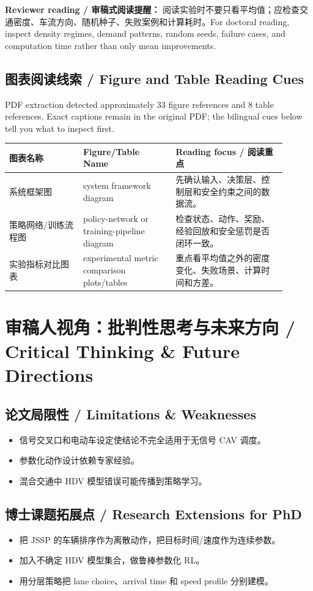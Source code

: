 \documentclass[UTF8,a4paper,11pt,fontset=fandol]{ctexart}
\begin{document}
\textbf{Reviewer reading / 审稿式阅读提醒：} 阅读实验时不要只看平均值；应检查交通密度、车流方向、随机种子、失败案例和计算耗时。For doctoral reading, inspect density regimes, demand patterns, random seeds, failure cases, and computation time rather than only mean improvements.

\subsection{图表阅读线索 / Figure and Table Reading Cues}
PDF extraction detected approximately 33 figure references and 8 table references. Exact captions remain in the original PDF; the bilingual cues below tell you what to inspect first.

\begin{longtable}{p{0.24\linewidth}p{0.30\linewidth}p{0.36\linewidth}}
\toprule
图表名称 & Figure/Table Name & Reading focus / 阅读重点\\
\midrule
系统框架图 & system framework diagram & 先确认输入、决策层、控制层和安全约束之间的数据流。 \\
策略网络/训练流程图 & policy-network or training-pipeline diagram & 检查状态、动作、奖励、经验回放和安全惩罚是否闭环一致。 \\
实验指标对比图表 & experimental metric comparison plots/tables & 重点看平均值之外的密度变化、失败场景、计算时间和方差。 \\
\bottomrule
\end{longtable}

\section{审稿人视角：批判性思考与未来方向 / Critical Thinking \& Future Directions}
\subsection{论文局限性 / Limitations \& Weaknesses}
\begin{itemize}
\item 信号交叉口和电动车设定使结论不完全适用于无信号 CAV 调度。
\item 参数化动作设计依赖专家经验。
\item 混合交通中 HDV 模型错误可能传播到策略学习。
\end{itemize}


\subsection{博士课题拓展点 / Research Extensions for PhD}
\begin{itemize}
\item 把 JSSP 的车辆排序作为离散动作，把目标时间/速度作为连续参数。
\item 加入不确定 HDV 模型集合，做鲁棒参数化 RL。
\item 用分层策略把 lane choice、arrival time 和 speed profile 分别建模。
\end{itemize}
\end{document}
